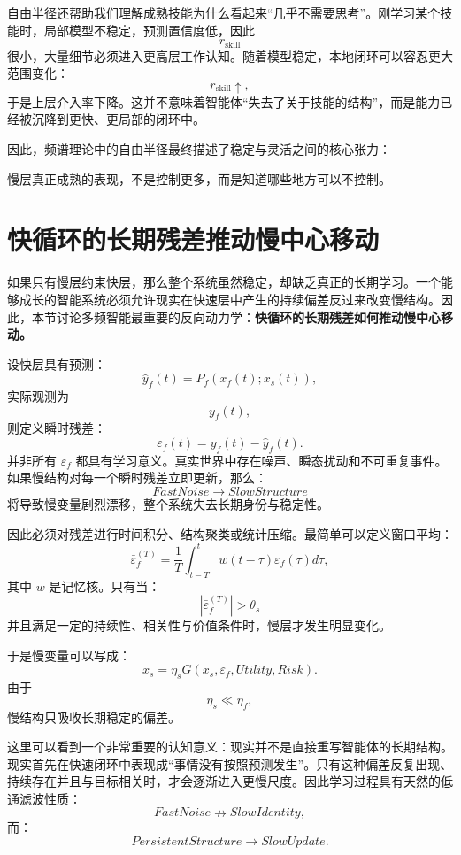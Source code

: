 自由半径还帮助我们理解成熟技能为什么看起来“几乎不需要思考”。刚学习某个技能时，局部模型不稳定，预测置信度低，因此
\[
r_{\mathrm{skill}}
\]
很小，大量细节必须进入更高层工作认知。随着模型稳定，本地闭环可以容忍更大范围变化：
\[
r_{\mathrm{skill}}\uparrow,
\]
于是上层介入率下降。这并不意味着智能体“失去了关于技能的结构”，而是能力已经被沉降到更快、更局部的闭环中。

因此，频谱理论中的自由半径最终描述了稳定与灵活之间的核心张力：
\begin{statementbox}
\centering
{}
\end{statementbox}
慢层真正成熟的表现，不是控制更多，而是知道哪些地方可以不控制。

\section{快循环的长期残差推动慢中心移动}

如果只有慢层约束快层，那么整个系统虽然稳定，却缺乏真正的长期学习。一个能够成长的智能系统必须允许现实在快速层中产生的持续偏差反过来改变慢结构。因此，本节讨论多频智能最重要的反向动力学：\textbf{快循环的长期残差如何推动慢中心移动。}

设快层具有预测：
\[
\hat{y}_f(t)
=
P_f
\left(
x_f(t);x_s(t)
\right),
\]
实际观测为
\[
y_f(t),
\]
则定义瞬时残差：
\[
\varepsilon_f(t)
=
y_f(t)-\hat{y}_f(t).
\]
并非所有 $\varepsilon_f$ 都具有学习意义。真实世界中存在噪声、瞬态扰动和不可重复事件。如果慢结构对每一个瞬时残差立即更新，那么：
\[
FastNoise
\rightarrow
SlowStructure
\]
将导致慢变量剧烈漂移，整个系统失去长期身份与稳定性。

因此必须对残差进行时间积分、结构聚类或统计压缩。最简单可以定义窗口平均：
\[
\bar{\varepsilon}_f^{(T)}
=
\frac{1}{T}
\int_{t-T}^{t}
w(t-\tau)
\varepsilon_f(\tau)
d\tau,
\]
其中 $w$ 是记忆核。只有当：
\[
\left|
\bar{\varepsilon}_f^{(T)}
\right|
>
\theta_s
\]
并且满足一定的持续性、相关性与价值条件时，慢层才发生明显变化。

于是慢变量可以写成：
\[
\dot{x}_s
=
\eta_s
G
\left(
x_s,
\bar{\varepsilon}_f,
Utility,
Risk
\right).
\]
由于
\[
\eta_s\ll\eta_f,
\]
慢结构只吸收长期稳定的偏差。

这里可以看到一个非常重要的认知意义：现实并不是直接重写智能体的长期结构。现实首先在快速闭环中表现成“事情没有按照预测发生”。只有这种偏差反复出现、持续存在并且与目标相关时，才会逐渐进入更慢尺度。因此学习过程具有天然的低通滤波性质：
\[
FastNoise
\nrightarrow
SlowIdentity,
\]
而：
\[
PersistentStructure
\rightarrow
SlowUpdate.
\]

